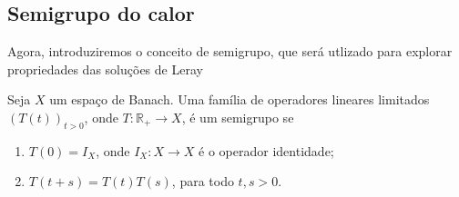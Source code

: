 \documentclass[a4paper, 11pt]{book}
\theoremstyle{definition}
\newcommand{\bR}{\mathbb{R}}
\begin{document}
\subsection{Semigrupo do calor}

Agora, introduziremos o conceito de semigrupo, que será utlizado para explorar propriedades das soluções de Leray

\begin{dbox}
    Seja $X$ um espaço de Banach. Uma família de operadores lineares limitados $(T(t))_{t > 0}$, onde $T : \bR_+ \to X$, é um semigrupo se
    \begin{enumerate}
        \item $T(0) = I_X$, onde $I_X : X \to X$ é o operador identidade;
        \item $T(t + s) = T(t)T(s)$,  para todo $t, s > 0$.
    \end{enumerate}
\end{dbox}
\end{document}
